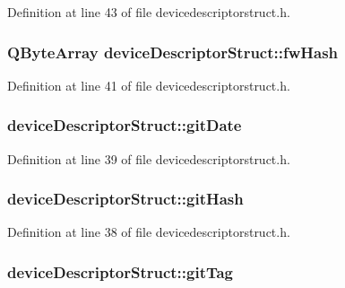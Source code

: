 \-Definition at line 43 of file devicedescriptorstruct.\-h.

\hypertarget{group___u_a_v_object_util_plugin_ga95764afe0cb2f53538af8c885eed80aa}{
\subsubsection[{fw\-Hash}]{\setlength{\rightskip}{0pt plus 5cm}\-Q\-Byte\-Array {\bf device\-Descriptor\-Struct\-::fw\-Hash}}}\label{group___u_a_v_object_util_plugin_ga95764afe0cb2f53538af8c885eed80aa}


\-Definition at line 41 of file devicedescriptorstruct.\-h.

\hypertarget{group___u_a_v_object_util_plugin_gaf7688dd9b2d5fe676da57bbca33e460d}{
\subsubsection[{git\-Date}]{ {\bf device\-Descriptor\-Struct\-::git\-Date}}}\label{group___u_a_v_object_util_plugin_gaf7688dd9b2d5fe676da57bbca33e460d}


\-Definition at line 39 of file devicedescriptorstruct.\-h.

\hypertarget{group___u_a_v_object_util_plugin_ga7c265729bc1bc959e63a3c8f0f1543e8}{
\subsubsection[{git\-Hash}]{ {\bf device\-Descriptor\-Struct\-::git\-Hash}}}\label{group___u_a_v_object_util_plugin_ga7c265729bc1bc959e63a3c8f0f1543e8}


\-Definition at line 38 of file devicedescriptorstruct.\-h.

\hypertarget{group___u_a_v_object_util_plugin_ga69f44ea76d04a61aac18e4393eba4e84}{
\subsubsection[{git\-Tag}]{ {\bf device\-Descriptor\-Struct\-::git\-Tag}}}\label{group___u_a_v_object_util_plugin_ga69f44ea76d04a61aac18e4393eba4e84}


